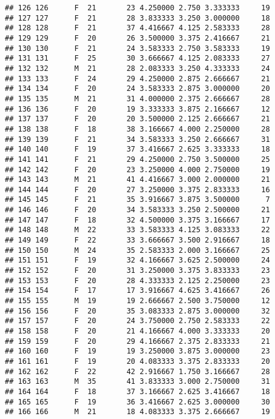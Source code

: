 \documentclass[
]{article}
\begin{document}
\begin{verbatim}
## 126 126      F  21       23 4.250000 2.750 3.333333     19
## 127 127      F  21       28 3.833333 3.250 3.000000     18
## 128 128      F  21       37 4.416667 4.125 2.583333     28
## 129 129      F  20       26 3.500000 3.375 2.416667     21
## 130 130      F  21       24 3.583333 2.750 3.583333     19
## 131 131      F  25       30 3.666667 4.125 2.083333     27
## 132 132      M  21       28 2.083333 3.250 4.333333     24
## 133 133      F  24       29 4.250000 2.875 2.666667     21
## 134 134      F  20       24 3.583333 2.875 3.000000     20
## 135 135      M  21       31 4.000000 2.375 2.666667     28
## 136 136      F  20       19 3.333333 3.875 2.166667     12
## 137 137      F  20       20 3.500000 2.125 2.666667     21
## 138 138      F  18       38 3.166667 4.000 2.250000     28
## 139 139      F  21       34 3.583333 3.250 2.666667     31
## 140 140      F  19       37 3.416667 2.625 3.333333     18
## 141 141      F  21       29 4.250000 2.750 3.500000     25
## 142 142      F  20       23 3.250000 4.000 2.750000     19
## 143 143      M  21       41 4.416667 3.000 2.000000     21
## 144 144      F  20       27 3.250000 3.375 2.833333     16
## 145 145      F  21       35 3.916667 3.875 3.500000      7
## 146 146      F  20       34 3.583333 3.250 2.500000     21
## 147 147      F  18       32 4.500000 3.375 3.166667     17
## 148 148      M  22       33 3.583333 4.125 3.083333     22
## 149 149      F  22       33 3.666667 3.500 2.916667     18
## 150 150      M  24       35 2.583333 2.000 3.166667     25
## 151 151      F  19       32 4.166667 3.625 2.500000     24
## 152 152      F  20       31 3.250000 3.375 3.833333     23
## 153 153      F  20       28 4.333333 2.125 2.250000     23
## 154 154      F  17       17 3.916667 4.625 3.416667     26
## 155 155      M  19       19 2.666667 2.500 3.750000     12
## 156 156      F  20       35 3.083333 2.875 3.000000     32
## 157 157      F  20       24 3.750000 2.750 2.583333     22
## 158 158      F  20       21 4.166667 4.000 3.333333     20
## 159 159      F  20       29 4.166667 2.375 2.833333     21
## 160 160      F  19       19 3.250000 3.875 3.000000     23
## 161 161      F  19       20 4.083333 3.375 2.833333     20
## 162 162      F  22       42 2.916667 1.750 3.166667     28
## 163 163      M  35       41 3.833333 3.000 2.750000     31
## 164 164      F  18       37 3.166667 2.625 3.416667     18
## 165 165      F  19       36 3.416667 2.625 3.000000     30
## 166 166      M  21       18 4.083333 3.375 2.666667     19
\end{verbatim}
\end{document}
